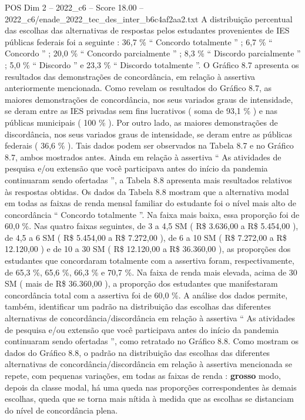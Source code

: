 \begin{textsample}{POS Dim 2 – 2022\_c6 – Score 18.00 – 2022\_c6/enade\_2022\_tec\_des\_inter\_b6c4af2aa2.txt}
A distribuição percentual das escolhas das alternativas de respostas pelos estudantes provenientes de IES públicas federais foi a seguinte : 36,7 \% “ Concordo totalmente ” ; 6,7 \% “ Concordo ” ; 20,0 \% “ Concordo parcialmente ” ; 8,3 \% “ Discordo parcialmente ” ; 5,0 \% “ Discordo ” e 23,3 \% “ Discordo totalmente ”.
O Gráfico 8.7 apresenta os resultados das demonstrações de concordância, em relação à assertiva anteriormente mencionada.
Como revelam os resultados do Gráfico 8.7, as maiores demonstrações de concordância, nos seus variados graus de intensidade, se deram entre as IES privadas sem fins lucrativos ( soma de 93,1 \% ) e nas públicas municipais ( 100 \% ).
Por outro lado, as maiores demonstrações de discordância, nos seus variados graus de intensidade, se deram entre as públicas federais ( 36,6 \% ).
Tais dados podem ser observados na Tabela 8.7 e no Gráfico 8.7, ambos mostrados antes.
Ainda em relação à assertiva “ As atividades de pesquisa e/ou extensão que você participava antes do início da pandemia continuaram sendo ofertadas ”, a Tabela 8.8 apresenta mais resultados relativos às respostas obtidas.
Os dados da Tabela 8.8 mostram que a alternativa modal em todas as faixas de renda mensal familiar do estudante foi o nível mais alto de concordância “ Concordo totalmente ”.
Na faixa mais baixa, essa proporção foi de 60,0 \%.
Nas quatro faixas seguintes, de 3 a 4,5 SM ( R\$ 3.636,00 a R\$ 5.454,00 ), de 4,5 a 6 SM ( R\$ 5.454,00 a R\$ 7.272,00 ), de 6 a 10 SM ( R\$ 7.272,00 a R\$ 12.120,00 ) e de 10 a 30 SM ( R\$ 12.120,00 a R\$ 36.360,00 ), as proporções dos estudantes que concordaram totalmente com a assertiva foram, respectivamente, de 65,3 \%, 65,6 \%, 66,3 \% e 70,7 \%.
Na faixa de renda mais elevada, acima de 30 SM ( mais de R\$ 36.360,00 ), a proporção dos estudantes que manifestaram concordância total com a assertiva foi de 60,0 \%.
A análise dos dados permite, também, identificar um padrão na distribuição das escolhas das diferentes alternativas de concordância/discordância em relação à assertiva “ As atividades de pesquisa e/ou extensão que você participava antes do início da pandemia continuaram sendo ofertadas ”, como retratado no Gráfico 8.8.
Como mostram os dados do Gráfico 8.8, o padrão na distribuição das escolhas das diferentes alternativas de concordância/discordância em relação à assertiva mencionada se repete, com pequenas variações, em todas as faixas de renda : \textbf{grosso} modo, depois da classe modal, há uma queda nas proporções correspondentes às demais escolhas, queda que se torna mais nítida à medida que as escolhas se distanciam do nível de concordância plena.

\end{textsample}

